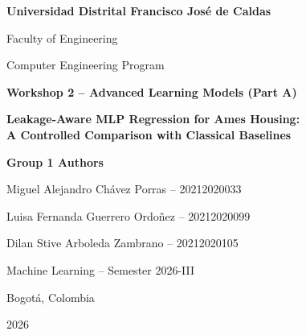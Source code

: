 \documentclass[11pt,a4paper]{article}
\newcommand{\reporttitle}{Leakage-Aware MLP Regression for Ames Housing:\\[0.35em]
A Controlled Comparison with Classical Baselines}
\begin{document}
\hypersetup{pageanchor=false}
\begin{titlepage}
\centering
\vspace*{1.0cm}
{\Large\bfseries Universidad Distrital Francisco Jos\'e de Caldas\par}
\vspace{0.55cm}
{\large Faculty of Engineering\par}
{\large Computer Engineering Program\par}

\vfill
{\Large\bfseries Workshop 2 -- Advanced Learning Models (Part A)\par}
\vspace{0.8cm}
{\LARGE\bfseries \reporttitle\par}

\vfill
{\large\bfseries Group 1 Authors\par}
\vspace{0.5cm}
{\large Miguel Alejandro Ch\'avez Porras -- 20212020033\par}
{\large Luisa Fernanda Guerrero Ordo\~nez -- 20212020099\par}
{\large Dilan Stive Arboleda Zambrano -- 20212020105\par}

\vfill
{\large Machine Learning -- Semester 2026-III\par}
{\large Bogot\'a, Colombia\par}
\vspace{0.5cm}
{\large 2026\par}
\end{titlepage}

\hypersetup{pageanchor=true}
\tableofcontents
\clearpage
{}

\begin{abstract}
Residential price prediction from heterogeneous tabular data requires nonlinear modeling while remaining robust to skewed targets, sparse categories, and rare high-value transactions. This work develops a leakage-aware multilayer perceptron (MLP) for the Ames Housing dataset, diagnoses an initial optimization failure, and evaluates controlled changes in architecture, dropout, weight decay, learning rate, and train-only standardization. The selected 261-128-64-1 network achieved a test mean absolute error (MAE) of \$14,666.23 on 440 held-out properties, improving the Workshop 1 Ridge, Random Forest, and Gradient Boosting baselines by 2.43\%, 12.18\%, and 1.42\%, respectively. Random Forest nevertheless retained the best root mean squared error and coefficient of determination, while Gradient Boosting retained the best logarithmic error. The results show that target conditioning and stable validation procedures can make an MLP competitive on a small tabular dataset, but do not establish universal neural-network superiority.
\end{abstract}
\end{document}
